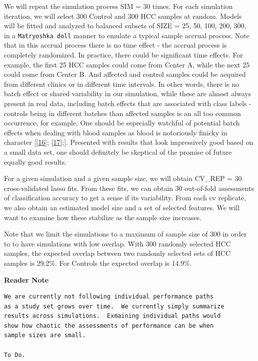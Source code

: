 \documentclass[
]{book}
\begin{document}
We will repeat the simulation process SIM = 30 times.
For each simulation iteration, we will select 300 Control and
300 HCC samples at random. Models will be fitted and analyzed
to balanced subsets of SIZE = 25, 50, 100, 200, 300, in a \texttt{Matryoshka\ doll} manner to
emulate a typical sample accrual process. Note that in this accrual process
there is no time effect - the accrual process is completely randomized. In practice,
there could be significant time effects. For example, the first 25 HCC samples could come
from Center A, while the next 25 could come from Center B. And
affected and control samples could be acquired from different clinics
or in different time intervals. In other words,
there is no batch effect or shared variability in our simulation,
while these are almost always present in real data, including
batch effects that are associated with class labels - controls being in
different batches than affected samples is an all too common occurrence,
for example. One should be especially watchful of potential batch effects
when dealing with blood samples as blood is notoriously finicky in
character {[}{[}\protect\hyperlink{ref-Huang:2017aa}{16}{]}; {[}\protect\hyperlink{ref-Permenter:2015aa}{17}{]};{]}.
Presented with results that look impressively good based on a small data set,
one should definitely be skeptical of the promise of future equally good results.

For a given simulation and a given sample size, we will obtain
CV\_REP = 30 cross-validated lasso fits. From these fits,
we can obtain 30 out-of-fold assessments of classification accuracy
to get a sense if its variability. From each cv replicate, we also obtain
an estimated model size and a set of selected features. We will want
to examine how these stabilize as the sample size increases.

Note that we limit the simulations to a maximum of sample size of 300 in
order to to have simulations with low overlap. With 300
randomly selected HCC samples, the expected overlap between two randomly
selected sets of HCC samples is 29.2\%.
For Controls the expected overlap is 14.9\%.

\textbf{Reader Note}

\begin{verbatim}
We are currently not following individual performance paths
as a study set grows over time.  We currently simply summarize
results across simulations.  Exmaining individual paths would
show how chaotic the assessments of performance can be when
sample sizes are small.

To Do.
\end{verbatim}
\end{document}
